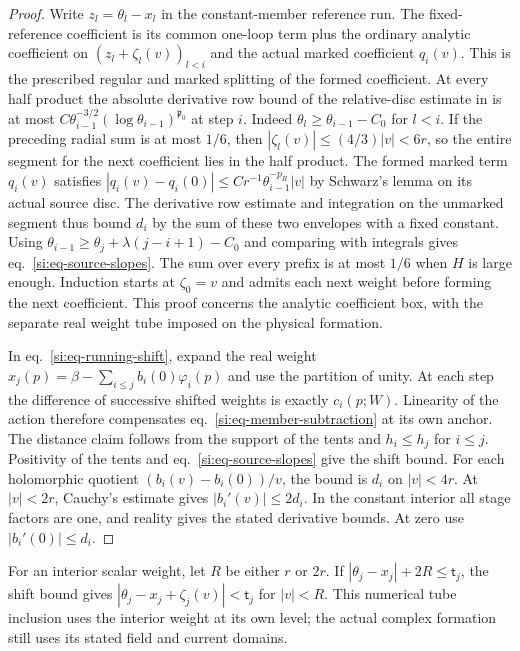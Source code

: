 \documentclass[11pt,letterpaper,reqno]{amsart}
\numberwithin{equation}{section}
\renewcommand{\eqref}[1]{\textup{eq.~\ref{#1}}}
\theoremstyle{definition}
\theoremstyle{remark}
\begin{document}
\begin{proof}
Write $z_l=\theta_l-x_l$ in the constant-member reference run.
The fixed-reference coefficient is its common one-loop term
plus the ordinary analytic coefficient on
$(z_l+\zeta_l(v))_{l<i}$ and the actual marked coefficient
$q_i(v)$. This is the prescribed regular and marked splitting
of the formed coefficient. At every half product the absolute derivative row
bound of the relative-disc estimate in \cite{RT} is at most
$C\theta_{i-1}^{-3/2}(\log\theta_{i-1})^{\mathfrak p_0}$ at step $i$.
Indeed $\theta_l\ge\theta_{i-1}-C_0$ for $l<i$. If the preceding
radial sum is at most $1/6$, then $|\zeta_l(v)|\le(4/3)|v|<6r$,
so the entire segment for the next coefficient lies in the half
product. The formed marked term $q_i(v)$ satisfies
$|q_i(v)-q_i(0)|\le C r^{-1}\theta_{i-1}^{-p_R}|v|$ by Schwarz's
lemma on its actual source disc. The derivative row estimate and
integration on the unmarked segment thus bound $d_i$ by the sum of
these two envelopes with a fixed constant. Using
$\theta_{i-1}\ge\theta_j+\lambda(j-i+1)-C_0$ and comparing with
integrals gives \eqref{si:eq-source-slopes}. The sum over every
prefix is at most $1/6$ when $H$ is large enough. Induction starts at
$\zeta_0=v$ and admits each next weight before forming the next
coefficient. This proof concerns the analytic coefficient box, with
the separate real weight tube imposed on the physical formation.

In \eqref{si:eq-running-shift}, expand the real weight
$x_j(p)=\beta-\sum_{i\le j}b_i(0)\varphi_i(p)$ and use the partition
of unity. At each step the difference of successive shifted weights
is exactly $c_i(p;W)$. Linearity of the action therefore compensates
\eqref{si:eq-member-subtraction} at its own anchor. The distance
claim follows from the support of the tents and $h_i\le h_j$ for
$i\le j$. Positivity of the tents and \eqref{si:eq-source-slopes}
give the shift bound. For each holomorphic quotient
$(b_i(v)-b_i(0))/v$, the bound is $d_i$ on $|v|<4r$. At $|v|<2r$,
Cauchy's estimate gives $|b_i'(v)|\le2d_i$. In the constant interior
all stage factors are one, and reality gives the stated derivative
bounds. At zero use $|b_i'(0)|\le d_i$.
\end{proof}

For an interior scalar weight, let $R$ be either $r$ or $2r$.
If $|\theta_j-x_j|+2R\le\mathsf t_j$, the shift bound gives
$|\theta_j-x_j+\zeta_j(v)|<\mathsf t_j$ for $|v|<R$.
This numerical tube inclusion uses the interior weight at its
own level; the actual complex formation still uses its stated
field and current domains.
\end{document}

